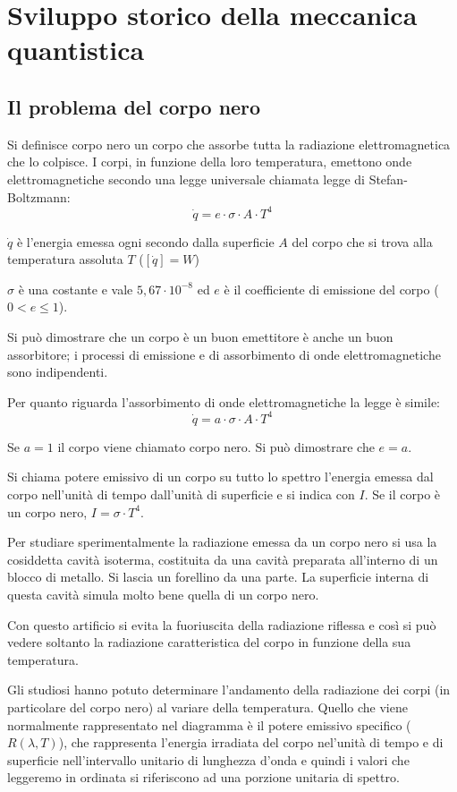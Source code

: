 \section{Sviluppo storico della meccanica quantistica}
    \subsection{Il problema del corpo nero}
        \par Si definisce corpo nero un corpo che assorbe tutta la radiazione elettromagnetica che lo colpisce. I corpi, in funzione della loro temperatura, emettono onde elettromagnetiche secondo una legge universale chiamata legge di Stefan-Boltzmann:
        \begin{equation}
            \dot{q} = e \cdot \sigma \cdot A \cdot T^4
        \end{equation}
        \par $\dot{q}$ è l'energia emessa ogni secondo dalla superficie $A$ del corpo che si trova alla temperatura assoluta $T$ ($[\dot{q}] = W$)
        \par $\sigma$ è una costante e vale $5,67\cdot10^{-8}$ ed $e$ è il coefficiente di emissione del corpo ($0<e\leq1$).
        \par Si può dimostrare che un corpo è un buon emettitore è anche un buon assorbitore; i processi di emissione e di assorbimento di onde elettromagnetiche sono indipendenti.
        \par Per quanto riguarda l'assorbimento di onde elettromagnetiche la legge è simile:
        \begin{equation}
            \dot{q}=a\cdot\sigma\cdot A\cdot T^4
        \end{equation}
        \par Se $a=1$ il corpo viene chiamato corpo nero. Si può dimostrare che $e=a$.
        \par Si chiama potere emissivo di un corpo su tutto lo spettro l'energia emessa dal corpo nell'unità di tempo dall'unità di superficie e si indica con $I$. Se il corpo è un corpo nero, $I=\sigma\cdot T^4$.
        \par Per studiare sperimentalmente la radiazione emessa da un corpo nero si usa la cosiddetta cavità isoterma, costituita da una cavità preparata all'interno di un blocco di metallo. Si lascia un forellino da una parte. La superficie interna di questa cavità simula molto bene quella di un corpo nero.
        \par Con questo artificio si evita la fuoriuscita della radiazione riflessa e così si può vedere soltanto la radiazione caratteristica del corpo in funzione della sua temperatura.
        \par Gli studiosi hanno potuto determinare l'andamento della radiazione dei corpi (in particolare del corpo nero) al variare della temperatura. Quello che viene normalmente rappresentato nel diagramma è il potere emissivo specifico ($R(\lambda,T)$), che rappresenta l'energia irradiata del corpo nel'unità di tempo e di superficie nell'intervallo unitario di lunghezza d'onda e quindi i valori che leggeremo in ordinata si riferiscono ad una porzione unitaria di spettro.
